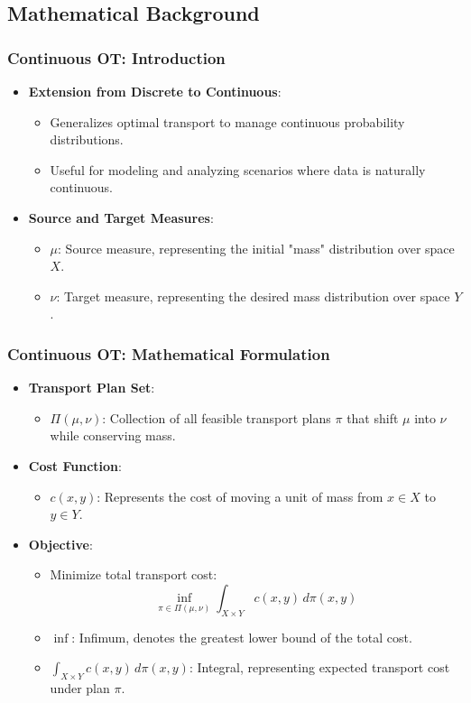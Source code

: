\documentclass{beamer}
\begin{document}
	\subsection{Mathematical Background}
	\begin{frame}
		\frametitle{Continuous OT: Introduction}
		\begin{itemize}
			\item \textbf{Extension from Discrete to Continuous}:
			\begin{itemize}
				\item Generalizes optimal transport to manage continuous probability distributions.
				\item Useful for modeling and analyzing scenarios where data is naturally continuous.
			\end{itemize}
			
			\item \textbf{Source and Target Measures}:
			\begin{itemize}
				\item \(\mu\): Source measure, representing the initial "mass" distribution over space \(X\).
				\item \(\nu\): Target measure, representing the desired mass distribution over space \(Y\).
			\end{itemize}
		
		\end{itemize}
	\end{frame}
	
	\begin{frame}
		\frametitle{Continuous OT: Mathematical Formulation}
		\begin{itemize}
			\item \textbf{Transport Plan Set}:
			\begin{itemize}
				\item \(\Pi(\mu, \nu)\): Collection of all feasible transport plans \(\pi\) that shift \(\mu\) into \(\nu\) while conserving mass.
			\end{itemize}
			
			\item \textbf{Cost Function}:
			\begin{itemize}
				\item \(c(x, y)\): Represents the cost of moving a unit of mass from \(x \in X\) to \(y \in Y\).
			\end{itemize}
			
			\item \textbf{Objective}:
			\begin{itemize}
				\item Minimize total transport cost:
				\[
				\inf_{\pi \in \Pi(\mu, \nu)} \int_{X \times Y} c(x, y) \, d\pi(x, y)
				\]
				\item \(\inf\): Infimum, denotes the greatest lower bound of the total cost.
				\item \(\int_{X \times Y} c(x, y) \, d\pi(x, y)\): Integral, representing expected transport cost under plan \(\pi\).
			\end{itemize}
		\end{itemize}
	\end{frame}
	
\end{document}
